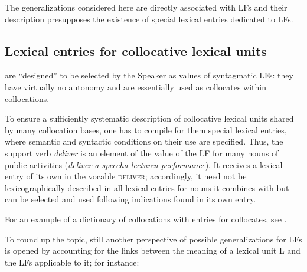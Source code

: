 The generalizations considered here are directly associated with LFs and their description presupposes the existence of special lexical entries dedicated to LFs.

\subsection{Lexical entries for collocative lexical units}\label{sec:lexicalEntriesCollocativesLUs}

 are ``designed'' to be selected by the Speaker as values of syntagmatic LFs: they have virtually no autonomy and are essentially used as collocates within collocations.

To ensure a sufficiently systematic description of collocative lexical units shared by many collocation bases, one has to compile for them special lexical entries, where semantic and syntactic conditions on their use are specified. Thus, the support verb \textit{deliver} is an element of the value of the LF  for many nouns of public activities (\textit{deliver a speech}\slashs\textit{a lecture}\slashs\textit{a performance}). It receives a lexical entry of its own in the vocable \textsc{deliver}; accordingly, it need not be lexicographically described in all lexical entries for nouns it combines with but can be selected and used following indications found in its own entry.

For an example of a dictionary of collocations with entries for collocates, see \textcite{Bosque2010}.

To round up the topic, still another perspective of possible generalizations for LFs is opened by accounting for the links between the meaning of a lexical unit L and the LFs applicable to it; for instance:

